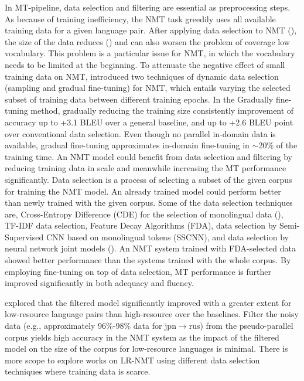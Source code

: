 \documentclass[manuscript,screen]{acmart}
\begin{document}
In MT-pipeline, data selection and filtering are essential as preprocessing steps. As because of training inefficiency, the NMT task greedily uses all available training data for a given language pair. After applying data selection to NMT (\citet{liu2020layer}), the size of the data reduces (\citet{cho2014learning, luong-etal-2015-addressing}) and can also worsen the problem of coverage low vocabulary. This problem is a particular issue for NMT, in which the vocabulary needs to be limited at the beginning. To attenuate the negative effect of small training data on NMT, \citet{van2017dynamic} introduced two techniques of dynamic data selection (sampling and gradual fine-tuning) for NMT, which entails varying the selected subset of training data between different training epochs. In the Gradually fine-tuning method, gradually reducing the training size consistently improvement of accuracy up to +3.1 BLEU over a general baseline, and up to +2.6 BLEU point over conventional data selection. Even though no parallel in-domain data is available, gradual fine-tuning approximates in-domain fine-tuning in $\sim$20\% of the training time. 
An NMT model could benefit from data selection and filtering by reducing training data in scale and meanwhile increasing the MT performance significantly. 
Data selection is a process of selecting a subset of the given corpus for training the NMT model. An already trained model could perform better than newly trained with the given corpus. Some of the data selection techniques are, Cross-Entropy Difference (CDE) for the selection of monolingual data (\citet{junczys2016log}), TF-IDF data selection, Feature Decay Algorithms (FDA), data selection by Semi-Supervised CNN based on monolingual tokens (SSCNN), and data selection by neural network joint models (\citet{silva2018extracting, chen2016bilingual}). An NMT system trained with FDA-selected data showed better performance than the systems trained with the whole corpus. By employing fine-tuning on top of data selection, MT performance is further improved significantly in both adequacy and fluency.

\citet{imankulova2017improving} explored that the filtered model significantly improved with a greater extent for low-resource language pairs than high-resource over the baselines. Filter the noisy data (e.g., approximately 96\%-98\% data for jpn$\rightarrow$rus) from the pseudo-parallel corpus yields high accuracy in the NMT system as the impact of the filtered model on the size of the corpus for low-resource languages is minimal. There is more scope to explore works on LR-NMT using different data selection techniques where training data is scarce.
\end{document}
